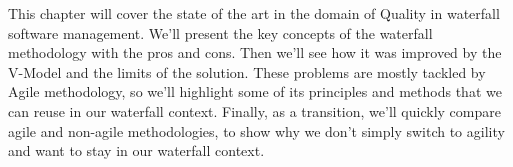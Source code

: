 This chapter will cover the state of the art in the domain of Quality in
waterfall software management.
We'll present the key concepts of the waterfall methodology with the pros and
cons.
Then we'll see how it was improved by the V-Model and the limits of the
solution.
These problems are mostly tackled by Agile methodology, so we'll highlight
some of its principles and methods that we can reuse in our waterfall context.
Finally, as a transition, we'll quickly compare agile and non-agile
methodologies, to show why we don't simply switch to agility and want to stay
in our waterfall context.








